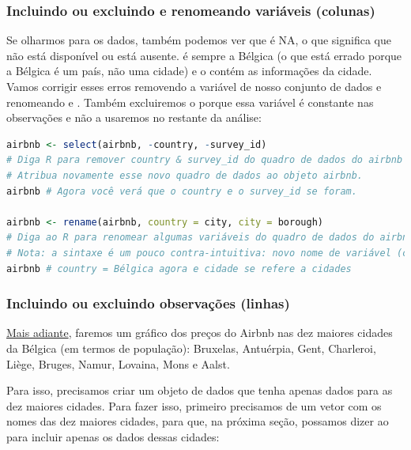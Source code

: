 \documentclass{article}
\begin{document}
\subsubsection{Incluindo ou excluindo e renomeando variáveis (colunas)}

Se olharmos para os dados, também podemos ver que  é NA, o que significa que não está disponível ou está ausente.  é sempre a Bélgica (o que está errado porque a Bélgica é um país, não uma cidade) e o  contém as informações da cidade. Vamos corrigir esses erros removendo a variável  de nosso conjunto de dados e renomeando  e . Também excluiremos o  porque essa variável é constante nas observações e não a usaremos no restante da análise:

\begin{lstlisting}[language=R]
airbnb <- select(airbnb, -country, -survey_id) 
# Diga R para remover country & survey_id do quadro de dados do airbnb incluindo um sinal de menos antes dessas variáveis.
# Atribua novamente esse novo quadro de dados ao objeto airbnb.
airbnb # Agora você verá que o country e o survey_id se foram.

airbnb <- rename(airbnb, country = city, city = borough) 
# Diga ao R para renomear algumas variáveis do quadro de dados do airbnb e reatribuir esse novo quadro de dados ao objeto do airbnb.
# Nota: a sintaxe é um pouco contra-intuitiva: novo nome de variável (country) = nome da variável antiga (city)!
airbnb # country = Bélgica agora e cidade se refere a cidades
\end{lstlisting}

\subsubsection{Incluindo ou excluindo observações (linhas)}

\vspace{.5cm}

\vspace{.5cm}

\href{https://bookdown.org/content/1340/graphs.html#graphs}{Mais adiante}, faremos um gráfico dos preços do Airbnb nas dez maiores cidades da Bélgica (em termos de população): Bruxelas, Antuérpia, Gent, Charleroi, Liège, Bruges, Namur, Lovaina, Mons e Aalst.

Para isso, precisamos criar um objeto de dados que tenha apenas dados para as dez maiores cidades. Para fazer isso, primeiro precisamos de um vetor com os nomes das dez maiores cidades, para que, na próxima seção, possamos dizer ao \faRProject para incluir apenas os dados dessas cidades:
\end{document}
